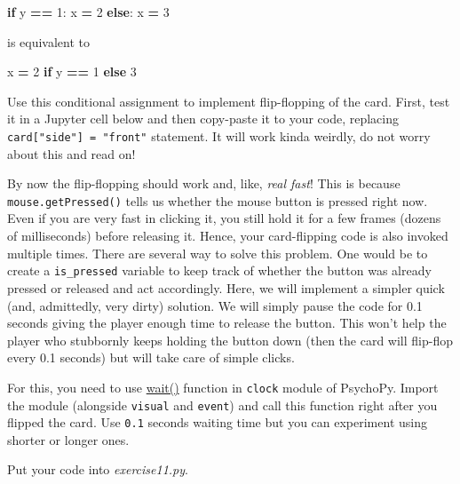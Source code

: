 \documentclass[
]{book}
\newenvironment{Shaded}{\begin{snugshade}}{\end{snugshade}}
\newcommand{\ControlFlowTok}[1]{\textcolor[rgb]{0.13,0.29,0.53}{\textbf{#1}}}
\newcommand{\DecValTok}[1]{\textcolor[rgb]{0.00,0.00,0.81}{#1}}
\newcommand{\NormalTok}[1]{#1}
\newcommand{\OperatorTok}[1]{\textcolor[rgb]{0.81,0.36,0.00}{\textbf{#1}}}
\begin{document}
\begin{Shaded}
\begin{Highlighting}[]
\ControlFlowTok{if}\NormalTok{ y }\OperatorTok{==} \DecValTok{1}\NormalTok{:}
\NormalTok{    x }\OperatorTok{=} \DecValTok{2}
\ControlFlowTok{else}\NormalTok{:}
\NormalTok{    x }\OperatorTok{=} \DecValTok{3}
\end{Highlighting}
\end{Shaded}

is equivalent to

\begin{Shaded}
\begin{Highlighting}[]
\NormalTok{x }\OperatorTok{=} \DecValTok{2} \ControlFlowTok{if}\NormalTok{ y }\OperatorTok{==} \DecValTok{1} \ControlFlowTok{else} \DecValTok{3}
\end{Highlighting}
\end{Shaded}

Use this conditional assignment to implement flip-flopping of the card. First, test it in a Jupyter cell below and then copy-paste it to your code, replacing \texttt{card{[}"side"{]}\ =\ "front"} statement. It will work kinda weirdly, do not worry about this and read on!

By now the flip-flopping should work and, like, \emph{real fast}! This is because \texttt{mouse.getPressed()} tells us whether the mouse button is pressed right now. Even if you are very fast in clicking it, you still hold it for a few frames (dozens of milliseconds) before releasing it. Hence, your card-flipping code is also invoked multiple times. There are several way to solve this problem. One would be to create a \texttt{is\_pressed} variable to keep track of whether the button was already pressed or released and act accordingly. Here, we will implement a simpler quick (and, admittedly, very dirty) solution. We will simply pause the code for 0.1 seconds giving the player enough time to release the button. This won't help the player who stubbornly keeps holding the button down (then the card will flip-flop every 0.1 seconds) but will take care of simple clicks.

For this, you need to use \href{https://psychopy.org/api/clock.html\#psychopy.clock.wait}{wait()} function in \texttt{clock} module of PsychoPy. Import the module (alongside \texttt{visual} and \texttt{event}) and call this function right after you flipped the card. Use \texttt{0.1} seconds waiting time but you can experiment using shorter or longer ones.

Put your code into \emph{exercise11.py}.
\end{document}
